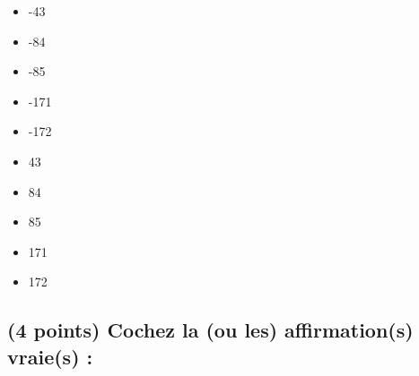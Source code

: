 \documentclass[11pt,a4paper]{article}
\begin{document}
\begin{table}[h!]
  \centering
  \begin{minipage}{0.45\textwidth}
\begin{itemize}
  \item[\CaseCoche] -43    \phantom{(} \\
  \item[\CaseCoche] -84    \phantom{(} \\  
  \item[\CaseCoche] -85    \phantom{(} \\ %
  \item[\CaseCoche] -171   \phantom{(} \\
  \item[\CaseCoche] -172   \phantom{(} \\
\end{itemize}
  \end{minipage}
  \hfillx
  \begin{minipage}{0.45\textwidth}
    \centering
\begin{itemize}
  \item[\CaseCoche] 43     \phantom{(} \\
  \item[\CaseCoche] 84     \phantom{(} \\
  \item[\CaseCoche] 85     \phantom{(} \\
  \item[\CaseCoche] 171    \phantom{(} \\ %
  \item[\CaseCoche] 172    \phantom{(} \\
\end{itemize}
  \end{minipage}
\end{table}


\bigskip


\subsection{(4 points) Cochez la (ou les) affirmation(s) vraie(s) : }
\end{document}
